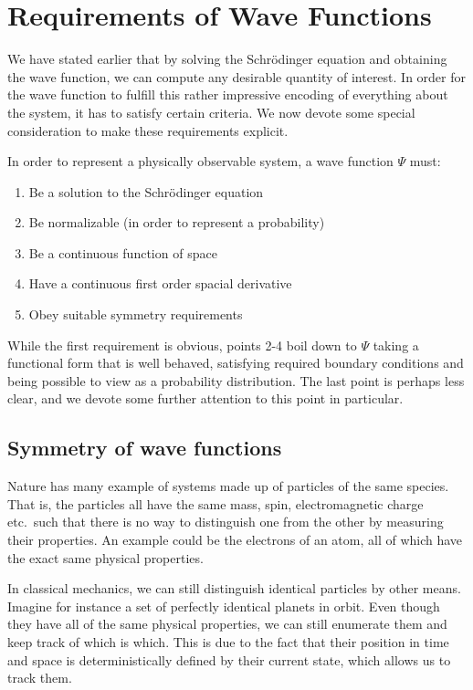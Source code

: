 \documentclass[Thesis.tex]{subfiles}
\begin{document}
\section{Requirements of Wave Functions}\label{sec:requirements-of-wave-functions}

We have stated earlier that by solving the Schrödinger equation and obtaining the wave
function, we can compute any desirable quantity of interest. In order for the wave
function to fulfill this rather impressive encoding of everything about the system, it has
to satisfy certain criteria. We now devote some special consideration to make these
requirements explicit.

In order to represent a physically observable system, a wave function $\Psi$ must:
\begin{enumerate}
    \item Be a solution to the Schrödinger equation
    \item Be normalizable (in order to represent a probability)
    \item Be a continuous function of space
    \item Have a continuous first order spacial derivative
    \item Obey suitable symmetry requirements
\end{enumerate}
%
While the first requirement is obvious, points 2-4 boil down to $\Psi$ taking a
functional form that is well behaved, satisfying required boundary conditions and being
possible to view as a probability distribution. The last point is perhaps less clear, and
we devote some further attention to this point in particular.


\subsection{Symmetry of wave functions}

Nature has many example of systems made up of particles of the same
species. That is, the particles all have the same mass, spin, electromagnetic
charge etc.\ such that there is no way to  distinguish one from the other by
measuring their properties. An example could be the electrons of an atom, all of
which have the exact same physical properties.

In classical mechanics, we can still distinguish identical particles by other
means. Imagine for instance a set of perfectly identical planets in orbit. Even
though they have all of the same physical properties, we can still enumerate
them and keep track of which is which. This is due to the fact that their
position in time and space is deterministically defined by their current state,
which allows us to track them.
\end{document}
